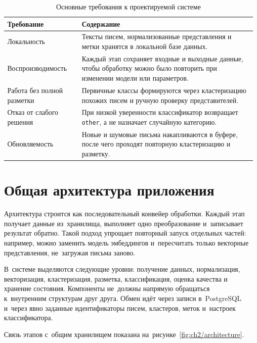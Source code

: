 \begin{table}[htbp]
    \centering
    \caption{Основные требования к проектируемой системе}\label{tab:ch2/requirements}
    \begin{tabular}{@{}p{}p{}@{}}
        \toprule
        Требование & Содержание \\
        \midrule
        Локальность & Тексты писем, нормализованные представления и метки хранятся
        в локальной базе данных. \\
        Воспроизводимость & Каждый этап сохраняет входные и выходные данные, чтобы
        обработку можно было повторить при изменении модели или параметров. \\
        Работа без полной разметки & Первичные классы формируются через
        кластеризацию похожих писем и ручную проверку представителей. \\
        Отказ от слабого решения & При низкой уверенности классификатор
        возвращает \texttt{other}, а не назначает случайную категорию. \\
        Обновляемость & Новые и шумовые письма накапливаются в буфере,
        после чего проходят повторную кластеризацию и разметку. \\
        \bottomrule
    \end{tabular}
\end{table}
\FloatBarrier

\section{Общая архитектура приложения}\label{sec:ch2/architecture}

Архитектура строится как последовательный конвейер обработки. Каждый этап
получает данные из~хранилища, выполняет одно преобразование и~записывает
результат обратно. Такой подход упрощает повторный запуск отдельных частей:
например, можно заменить модель эмбеддингов и~пересчитать только векторные
представления, не~загружая письма заново.

В~системе выделяются следующие уровни: получение данных, нормализация,
векторизация, кластеризация, разметка, классификация, оценка качества и
хранение состояния. Компоненты не~должны напрямую обращаться к~внутренним
структурам друг друга. Обмен идёт через записи в~PostgreSQL и~через явно
заданные идентификаторы писем, кластеров, меток и~настроек классификатора.

Связь этапов с~общим хранилищем показана на~рисунке~\ref{fig:ch2/architecture}.


